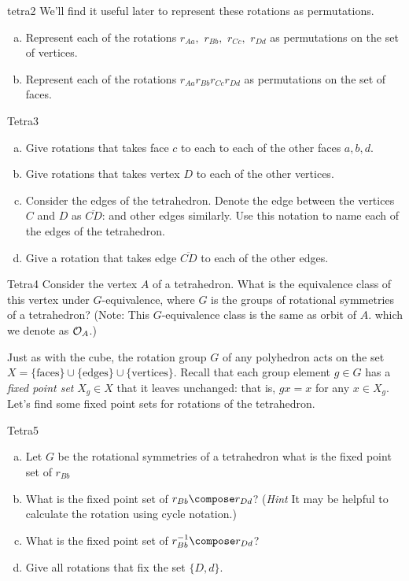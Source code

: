 \begin {exercise}{tetra2}
We'll find it useful later to represent these rotations as permutations.
\begin {enumerate}[(a)] 
\item Represent each of the rotations $r_{Aa},$ $r_{Bb},$ $r_{Cc},$ $r_{Dd}$ as permutations on the set of vertices.
\item Represent each of the rotations $r_{Aa}$$r_{Bb}$$r_{Cc}$$r_{Dd}$ as permutations on the set of faces.
\end{enumerate}
\end {exercise}
\begin {exercise}{Tetra3}
\begin {enumerate}[(a)]
\item Give rotations that takes face $c$ to each to each of the other faces $a, b, d$.
\item Give rotations that takes vertex $D$ to each of the other vertices.
\item Consider the edges of the tetrahedron.  Denote the edge between the vertices $C$ and $D$ as $\overline{CD}$: and other edges similarly.  Use this notation to name each of the edges of the tetrahedron.
 \item Give a rotation that takes edge $\overline{CD}$ to each of the other edges.
\end{enumerate}
\end{exercise} 
\begin {exercise}{Tetra4}
Consider the vertex $A$ of a tetrahedron.  What is the equivalence class of this vertex under $G$-equivalence, where $G$ is the groups of rotational symmetries of a tetrahedron?   (Note:  This $G$-equivalence class is the same as orbit of $A$. which we denote as ${\cal O}_A$.)
\end {exercise}


Just as with the cube, the rotation group $G$ of any polyhedron acts on the set $X=\{\text{faces}\}\cup\{\text{edges}\}\cup\{\text{vertices}\}$. Recall that each group element $g\in G$ has a \emph{fixed point set} $X_g\in X$ that it leaves unchanged: that is, $gx=x$ for any $x\in X_g$. Let's find some fixed point sets for rotations of the tetrahedron.

\begin {exercise}{Tetra5}
\begin {enumerate}[(a)]
\item Let $G$ be the rotational symmetries of a tetrahedron what is the fixed point set of $r_{Bb}$
\item What is the fixed point set of $r_{Bb}\compose r_{Dd}$? (\emph{Hint} It may be helpful to calculate the rotation using cycle notation.)
\item What is the fixed point set of $r_{Bb}^{-1}\compose r_{Dd}$?
\item Give all rotations that fix the set $\{D,d\}$. 
\end{enumerate}
\end {exercise}

